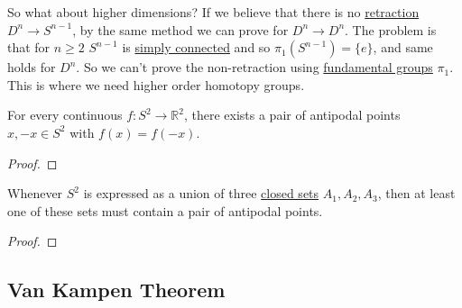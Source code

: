   So what about higher dimensions? If we believe that there is no \hyperref[def:retraction]{retraction} $D^n \to S^{n-1}$, by the same method we can prove for $D^n \to D^n$. The problem is that for $n \geq 2$ $S^{n-1}$ is \hyperref[def:simply-connected]{simply connected} and so $\pi_1(S^{n-1}) = \{e\}$, and same holds for $D^n$. So we can't prove the non-retraction using \hyperref[def:fundamental-group]{fundamental groups} $\pi_1$. This is where we need higher order homotopy groups. 

	\begin{theorem}
	  \label{thm:antipodal-points-in-s2}
		For every continuous $f: S^2 \to \mathbb{R}^2$, there exists a pair of antipodal points $x, -x \in S^2$ with $f(x) = f(-x)$. 
	\end{theorem}
	\begin{proof}
	  
	\end{proof}

	\begin{corollary}
	  \label{thm:antipodal-points-in-closed-cover-of-s2}
	  Whenever $S^2$ is expressed as a union of three \hyperref[pst-def:closed]{closed sets} $A_1, A_2, A_3$, then at least one of these sets must contain a pair of antipodal points. 
	\end{corollary}
	\begin{proof}
	  
	\end{proof}

\subsection{Van Kampen Theorem}

